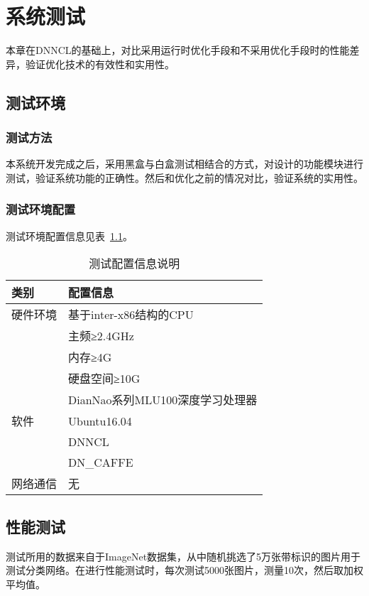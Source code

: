 
\chapter{系统测试}
本章在DNNCL的基础上，对比采用运行时优化手段和不采用优化手段时的性能差异，验证优化技术的有效性和实用性。

\section{测试环境}
\subsection {测试方法}
本系统开发完成之后，采用黑盒与白盒测试相结合的方式，对设计的功能模块进行测试，验证系统功能的正确性。然后和优化之前的情况对比，验证系统的实用性。

\subsection{测试环境配置}
测试环境配置信息见表~\ref{tab:experiment-env}。

\begin{table}[htb]
  \centering\small
  \caption{测试配置信息说明}
  \label{tab:experiment-env}
  \begin{tabular}{ll}
    \toprule
    类别       & 配置信息   \\
    \midrule
    硬件环境   & 基于inter-x86结构的CPU \\
              & 主频≥2.4GHz       \\
              & 内存≥4G     \\
              & 硬盘空间≥10G \\
              & DianNao系列MLU100深度学习处理器 \\
    软件  & Ubuntu16.04 \\
          & DNNCL \\
          & DN\_CAFFE  \\
    网络通信  & 无 \\ 
    \bottomrule
  \end{tabular}
\end{table}

\section {性能测试}
测试所用的数据来自于ImageNet数据集，从中随机挑选了5万张带标识的图片用于测试分类网络。在进行性能测试时，每次测试5000张图片，测量10次，然后取加权平均值。

